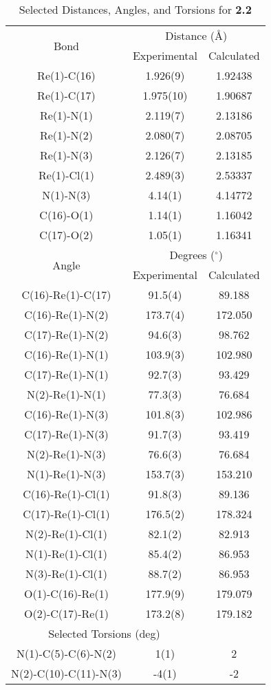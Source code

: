 \begin{table}[htbp]
  \caption{Selected Distances, Angles, and Torsions for \textbf{2.2}}
  \centering
    \begin{tabular}{ccc}
    \toprule
    \multirow{2}{*}{Bond} & \multicolumn{2}{c}{Distance (\r{A})} \\ \cline{2-3}
     & Experimental & Calculated \\ \midrule
    Re(1)-C(16) & 1.926(9) & 1.92438\\
    Re(1)-C(17) & 1.975(10) & 1.90687\\
    Re(1)-N(1) & 2.119(7) & 2.13186\\
    Re(1)-N(2) & 2.080(7) & 2.08705\\
    Re(1)-N(3) & 2.126(7) & 2.13185\\
    Re(1)-Cl(1) & 2.489(3) & 2.53337 \\
    N(1)-N(3) & 4.14(1) & 4.14772 \\ 
    C(16)-O(1) & 1.14(1) & 1.16042 \\
    C(17)-O(2) & 1.05(1) & 1.16341 \\ \midrule
    \multirow{2}{*}{Angle} & \multicolumn{2}{c}{Degrees ($^\circ$)} \\ \cline{2-3}
     & Experimental & Calculated \\ \midrule
    C(16)-Re(1)-C(17) & 91.5(4) & 89.188 \\
    C(16)-Re(1)-N(2) & 173.7(4) & 172.050 \\
    C(17)-Re(1)-N(2) & 94.6(3) & 98.762 \\
    C(16)-Re(1)-N(1) & 103.9(3) & 102.980 \\
    C(17)-Re(1)-N(1) & 92.7(3) & 93.429 \\
    N(2)-Re(1)-N(1) & 77.3(3) & 76.684 \\
    C(16)-Re(1)-N(3) & 101.8(3) & 102.986 \\
    C(17)-Re(1)-N(3) & 91.7(3) & 93.419 \\
    N(2)-Re(1)-N(3) & 76.6(3) & 76.684 \\
    N(1)-Re(1)-N(3) & 153.7(3) & 153.210 \\
    C(16)-Re(1)-Cl(1) & 91.8(3) & 89.136 \\
    C(17)-Re(1)-Cl(1) & 176.5(2) & 178.324 \\
    N(2)-Re(1)-Cl(1) & 82.1(2) & 82.913 \\
    N(1)-Re(1)-Cl(1) & 85.4(2) & 86.953 \\
    N(3)-Re(1)-Cl(1) & 88.7(2) & 86.953 \\
    O(1)-C(16)-Re(1) & 177.9(9) & 179.079 \\
    O(2)-C(17)-Re(1) & 173.2(8) & 179.182 \\ \midrule
    \multicolumn{2}{c}{Selected Torsions (deg)} \\ \midrule
    N(1)-C(5)-C(6)-N(2) & 1(1) & 2 \\
    N(2)-C(10)-C(11)-N(3) & -4(1) & -2 \\
    \bottomrule
    \end{tabular}%
  \label{tab.da2}%
\end{table}%


